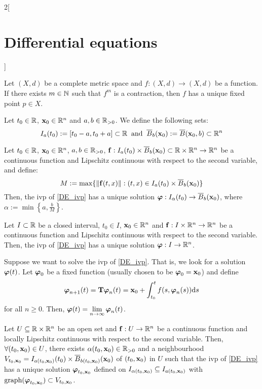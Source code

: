 \documentclass[../../../main.tex]{subfiles}
\begin{document}
\begin{multicols}{2}[\section{Differential equations}]
\begin{corollary}
        Let $(X,d)$ be a complete metric space and $f:(X,d)\rightarrow (X,d)$ be a function. If there exists $m\in\mathbb{N}$ such that $f^m$ is a contraction, then $f$ has a unique fixed point $p\in X$.
    \end{corollary}
    \begin{definition}
        Let $t_0\in\mathbb{R}$, $\boldsymbol{\mathrm{x}}_0\in\mathbb{R}^n$ and $a,b\in\mathbb{R}_{>0}$. We define the following sets: $$I_a(t_0):=[t_0-a,t_0+a]\subset\mathbb{R}\;\;\text{and}\;\;\overline{B}_{b}(\boldsymbol{\mathrm{x}}_0):=\overline{B}(\boldsymbol{\mathrm{x}}_0,b)\subset\mathbb{R}^n$$
    \end{definition}
    \begin{theorem}\label{DE_picard}
        Let $t_0\in\mathbb{R}$, $\boldsymbol{\mathrm{x}}_0\in\mathbb{R}^n$, $a,b\in\mathbb{R}_{>0}$, $\boldsymbol{\mathrm{f}}:I_a(t_0)\times\overline{B}_{b}(\boldsymbol{\mathrm{x}}_0)\subset\mathbb{R}\times\mathbb{R}^n\rightarrow\mathbb{R}^n$ be a continuous function and Lipschitz continuous with respect to the second variable, and define: $$M:=\max\{\|\boldsymbol{\mathrm{f}}(t,x)\|:(t,x)\in I_a(t_0)\times\overline{B}_{b}(\boldsymbol{\mathrm{x}}_0)\}$$ Then, the ivp of \cref{DE_ivp} has a unique solution $\boldsymbol{\mathrm{\varphi}}:I_\alpha(t_0)\rightarrow\overline{B}_{b}(\boldsymbol{\mathrm{x}}_0)$, where $\alpha:=\min\left\{a,\frac{b}{M}\right\}$.
    \end{theorem}
    \begin{corollary}
        Let $I\subset \mathbb{R}$ be a closed interval, $t_0\in I$, $\boldsymbol{\mathrm{x}}_0\in\mathbb{R}^n$ and $\boldsymbol{\mathrm{f}}:I\times\mathbb{R}^n\rightarrow\mathbb{R}^n$ be a continuous function and Lipschitz continuous with respect to the second variable. Then, the ivp of \cref{DE_ivp} has a unique solution $\boldsymbol{\mathrm{\varphi}}:I\rightarrow\mathbb{R}^n$.
    \end{corollary}
    \begin{corollary}
        Suppose we want to solve the ivp of \cref{DE_ivp}. That is, we look for a solution $\boldsymbol{\mathrm{\varphi}}(t)$. Let $\boldsymbol{\mathrm{\varphi}}_0$ be a fixed function (usually chosen to be $\boldsymbol{\mathrm{\varphi}}_0=\boldsymbol{\mathrm{x}}_0$) and define
        $$\boldsymbol{\mathrm{\varphi}}_{n+1}(t)=\boldsymbol{\mathrm{T}}\boldsymbol{\mathrm{\varphi}}_n(t)=\boldsymbol{\mathrm{x}}_0+\int_{t_0}^tf(s,\boldsymbol{\mathrm{\varphi}}_n(s))\dd s$$
        for all $n\geq 0$. Then, $\displaystyle\boldsymbol{\mathrm{\varphi}}(t)=\lim_{n\to\infty}\boldsymbol{\mathrm{\varphi}}_n(t)$.
    \end{corollary}
    \begin{corollary}
        Let $U\subseteq\mathbb{R}\times\mathbb{R}^n$ be an open set and $\boldsymbol{\mathrm{f}}:U\rightarrow\mathbb{R}^n$ be a continuous function and locally Lipschitz continuous with respect to the second variable. Then, $\forall(t_0,\boldsymbol{\mathrm{x}}_0)\in U$, there exists $\alpha(t_0,\boldsymbol{\mathrm{x}}_0)\in\mathbb{R}_{>0}$ and a neighbourhood $V_{t_0,\boldsymbol{\mathrm{x}}_0}=I_{a(t_0,\boldsymbol{\mathrm{x}}_0)}(t_0)\times\overline{B}_{b(t_0,\boldsymbol{\mathrm{x}}_0)}(\boldsymbol{\mathrm{x}}_0)$ of $(t_0,\boldsymbol{\mathrm{x}}_0)$ in $U$ such that the ivp of \cref{DE_ivp} has a unique solution $\boldsymbol{\mathrm{\varphi}}_{t_0,\boldsymbol{\mathrm{x}}_0}$ defined on $I_{\alpha(t_0,\boldsymbol{\mathrm{x}}_0)}\subseteq I_{a(t_0,\boldsymbol{\mathrm{x}}_0)}$ with $\operatorname{graph}(\boldsymbol{\mathrm{\varphi}}_{t_0,\boldsymbol{\mathrm{x}}_0})\subset V_{t_0,\boldsymbol{\mathrm{x}}_0}$.

\end{corollary}
\end{multicols}
\end{document}
